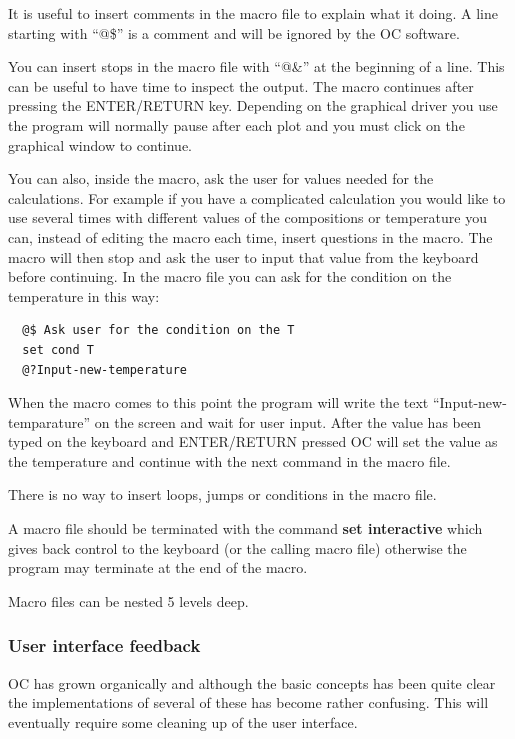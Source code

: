 \documentclass[11pt]{article}
\begin{document}
It is useful to insert comments in the macro file to explain what it
doing.  A line starting with ``@\$'' is a comment and will be ignored
by the OC software.

You can insert stops in the macro file with ``@\&'' at the beginning
of a line.  This can be useful to have time to inspect the output.
The macro continues after pressing the ENTER/RETURN key.  Depending on
the graphical driver you use the program will normally pause after
each plot and you must click on the graphical window to continue.

You can also, inside the macro, ask the user for values needed for the
calculations.  For example if you have a complicated calculation you
would like to use several times with different values of the
compositions or temperature you can, instead of editing the macro each
time, insert questions in the macro.  The macro will then stop and ask
the user to input that value from the keyboard before continuing.  In
the macro file you can ask for the condition on the temperature in
this way:

\begin{verbatim}
  @$ Ask user for the condition on the T
  set cond T
  @?Input-new-temperature

\end{verbatim}

When the macro comes to this point the program will write the text
``Input-new-temparature'' on the screen and wait for user input.
After the value has been typed on the keyboard and ENTER/RETURN
pressed OC will set the value as the temperature and continue with the
next command in the macro file.

There is no way to insert loops, jumps or conditions in the macro file.

A macro file should be terminated with the command {\bf set
  interactive} which gives back control to the keyboard (or the
calling macro file) otherwise the program may terminate at the end of
the macro.

Macro files can be nested 5 levels deep.

\subsubsection{User interface feedback}

OC has grown organically and although the basic concepts has been
quite clear the implementations of several of these has become rather
confusing.  This will eventually require some cleaning up of the user
interface.
\end{document}
